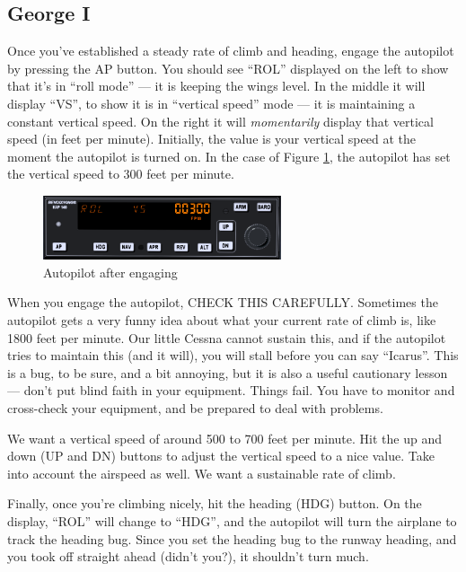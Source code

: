 \subsection{George I}

Once you've established a steady rate of climb and heading, engage the
autopilot by pressing the AP button.  You should see ``ROL'' displayed
on the left to show that it's in ``roll mode'' --- it is keeping the
wings level.  In the middle it will display ``VS'', to show it is in
``vertical speed'' mode --- it is maintaining a constant vertical
speed.  On the right it will \emph{momentarily} display that vertical
speed (in feet per minute).  Initially, the value is your vertical
speed at the moment the autopilot is turned on.  In the case of
Figure \ref{fig:ap_vs}, the autopilot has set the vertical speed to
300 feet per minute.

\begin{figure}
  \begin{center}
    \includegraphics[width=7cm]{img/ap_vs.png}
    \caption{Autopilot after engaging}
    \label{fig:ap_vs}
  \end{center}
\end{figure}


When you engage the autopilot, CHECK THIS CAREFULLY.  Sometimes the
autopilot gets a very funny idea about what your current rate of climb
is, like 1800 feet per minute.  Our little Cessna cannot sustain this,
and if the autopilot tries to maintain this (and it will), you will
stall before you can say ``Icarus''.  This is a bug, to be sure, and a
bit annoying, but it is also a useful cautionary lesson --- don't put
blind faith in your equipment.  Things fail.  You have to monitor and
cross-check your equipment, and be prepared to deal with problems.

We want a vertical speed of around 500 to 700 feet per minute.  Hit
the up and down (UP and DN) buttons to adjust the vertical speed to a
nice value.  Take into account the airspeed as well.  We want a
sustainable rate of climb.

Finally, once you're climbing nicely, hit the heading (HDG) button.
On the display, ``ROL'' will change to ``HDG'', and the autopilot will
turn the airplane to track the heading bug.  Since you set the heading
bug to the runway heading, and you took off straight ahead (didn't
you?), it shouldn't turn much.

